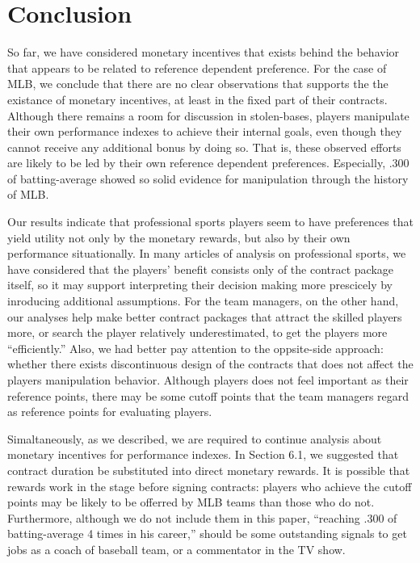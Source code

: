 \documentclass[dvipdfmx, 12pt]{article}
\begin{document}





\section{Conclusion}


So far, we have considered monetary incentives that exists behind the behavior that appears to be related to reference dependent preference. For the case of MLB, we conclude that there are no clear observations that supports the the existance of monetary incentives, at least in the fixed part of their contracts. Although there remains a room for discussion in stolen-bases, players manipulate their own performance indexes to achieve their internal goals, even though they cannot receive any additional bonus by doing so. That is, these observed efforts are likely to be led by their own reference dependent preferences. Especially, .300 of batting-average showed so solid evidence for manipulation through the history of MLB.

Our results indicate that professional sports players seem to have preferences that yield utility not only by the monetary rewards, but also by their own performance situationally. In many articles of analysis on professional sports, we have considered that the players' benefit consists only of the contract package itself, so it may support interpreting their decision making more prescicely by inroducing additional assumptions. For the team managers, on the other hand, our analyses help make better contract packages that attract the skilled players more, or search the player relatively underestimated, to get the players more ``efficiently.'' Also, we had better pay attention to the oppsite-side approach: whether there exists discontinuous design of the contracts that does not affect the players manipulation behavior. Although players does not feel important as their reference points, there may be some cutoff points that the team managers regard as reference points for evaluating players.

Simaltaneously, as we described, we are required to continue analysis about monetary incentives for performance indexes. In Section 6.1, we suggested that contract duration be substituted into direct monetary rewards. It is possible that rewards work in the stage before signing contracts: players who achieve the cutoff points may be likely to be offerred by MLB teams than those who do not. Furthermore, although we do not include them in this paper, %
``reaching .300 of batting-average 4 times in his career,'' should be some outstanding signals to get jobs as a coach of baseball team, or a commentator in the TV show.
\end{document}
